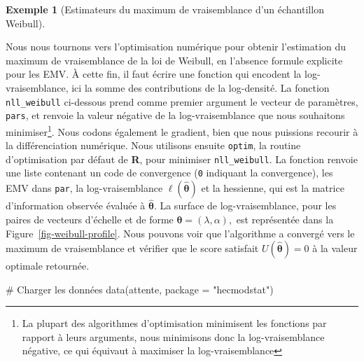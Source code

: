 \documentclass[
  11pt,
  letterpaper,
]{scrbook}
\newenvironment{Shaded}{\begin{snugshade}}{\end{snugshade}}
\newcommand{\AttributeTok}[1]{\textcolor[rgb]{0.40,0.45,0.13}{#1}}
\newcommand{\CommentTok}[1]{\textcolor[rgb]{0.37,0.37,0.37}{#1}}
\newcommand{\FunctionTok}[1]{\textcolor[rgb]{0.28,0.35,0.67}{#1}}
\newcommand{\NormalTok}[1]{\textcolor[rgb]{0.00,0.23,0.31}{#1}}
\newcommand{\StringTok}[1]{\textcolor[rgb]{0.13,0.47,0.30}{#1}}
\theoremstyle{plain}
\theoremstyle{plain}
\theoremstyle{definition}
\newtheorem{example}{Exemple}[chapter]
\theoremstyle{definition}
\theoremstyle{remark}
\begin{document}
\begin{example}[Estimateurs du maximum de vraisemblance d'un échantillon
Weibull]\protect\hypertarget{exm-evm-weibull}{}\label{exm-evm-weibull}

Nous nous tournons vers l'optimisation numérique pour obtenir
l'estimation du maximum de vraisemblance de la loi de Weibull, en
l'absence formule explicite pour les EMV. À cette fin, il faut écrire
une fonction qui encodent la log-vraisemblance, ici la somme des
contributions de la log-densité. La fonction \texttt{nll\_weibull}
ci-dessous prend comme premier argument le vecteur de paramètres,
\texttt{pars}, et renvoie la valeur négative de la log-vraisemblance que
nous souhaitons minimiser\footnote{La plupart des algorithmes
  d'optimisation minimisent les fonctions par rapport à leurs arguments,
  nous minimisons donc la log-vraisemblance négative, ce qui équivaut à
  maximiser la log-vraisemblance}. Nous codons également le gradient,
bien que nous puissions recourir à la différenciation numérique. Nous
utilisons ensuite \texttt{optim}, la routine d'optimisation par défaut
de \textbf{R}, pour minimiser \texttt{nll\_weibull}. La fonction renvoie
une liste contenant un code de convergence (\texttt{0} indiquant la
convergence), les EMV dans \texttt{par}, la log-vraisemblance
\(\ell(\widehat{\boldsymbol{\theta}})\) et la hessienne, qui est la
matrice d'information observée évaluée à
\(\widehat{\boldsymbol{\theta}}.\) La surface de log-vraisemblance, pour
les paires de vecteurs d'échelle et de forme
\(\boldsymbol{\theta} = (\lambda, \alpha),\) est représentée dans la
Figure~\ref{fig-weibull-profile}. Nous pouvons voir que l'algorithme a
convergé vers le maximum de vraisemblance et vérifier que le score
satisfait \(U(\widehat{\boldsymbol{\theta}}) = 0\) à la valeur optimale
retournée.

\begin{Shaded}
\begin{Highlighting}[]
\CommentTok{\# Charger les données}
\FunctionTok{data}\NormalTok{(attente, }\AttributeTok{package =} \StringTok{"hecmodstat"}\NormalTok{)}


\end{Highlighting}
\end{Shaded}
\end{example}
\end{document}
